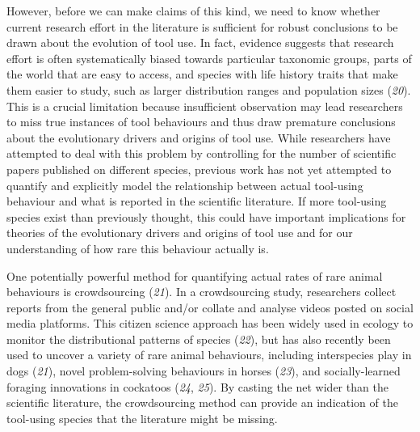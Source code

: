 \documentclass[
  man,floatsintext]{apa6}
\begin{document}
However, before we can make claims of this kind, we need to know whether current
research effort in the literature is sufficient for robust conclusions to be
drawn about the evolution of tool use. In fact, evidence suggests that research
effort is often systematically biased towards particular taxonomic groups, parts
of the world that are easy to access, and species with life history traits that
make them easier to study, such as larger distribution ranges and population
sizes (\emph{20}). This is a crucial limitation because insufficient
observation may lead researchers to miss true instances of tool behaviours and
thus draw premature conclusions about the evolutionary drivers and origins of
tool use. While researchers have attempted to deal with this problem by
controlling for the number of scientific papers published on different species,
previous work has not yet attempted to quantify and explicitly model the
relationship between actual tool-using behaviour and what is reported in the
scientific literature. If more tool-using species exist than previously thought,
this could have important implications for theories of the evolutionary drivers
and origins of tool use and for our understanding of how rare this behaviour
actually is.

One potentially powerful method for quantifying actual rates of rare animal
behaviours is crowdsourcing (\emph{21}). In a crowdsourcing study, researchers
collect reports from the general public and/or collate and analyse videos posted
on social media platforms. This citizen science approach has been widely used in
ecology to monitor the distributional patterns of species (\emph{22}), but
has also recently been used to uncover a variety of rare animal behaviours,
including interspecies play in dogs (\emph{21}), novel problem-solving
behaviours in horses (\emph{23}), and socially-learned foraging innovations
in cockatoos (\emph{24}, \emph{25}). By casting the net wider than the
scientific literature, the crowdsourcing method can provide an indication of the
tool-using species that the literature might be missing.
\end{document}
